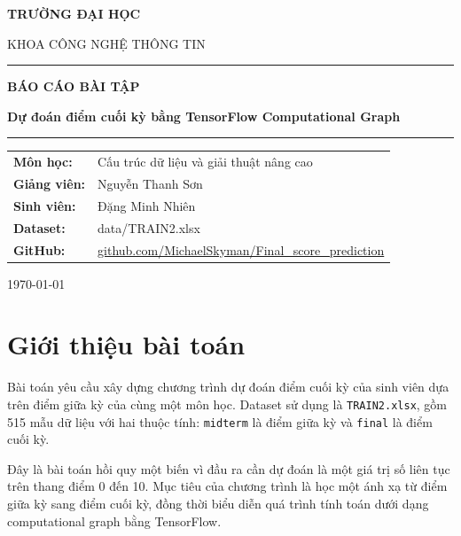\documentclass[12pt,a4paper]{article}
\begin{document}
\begin{titlepage}
    \centering
    \vspace*{0.6cm}
    {\Large\bfseries TRƯỜNG ĐẠI HỌC\par}
    \vspace{0.25cm}
    {\large KHOA CÔNG NGHỆ THÔNG TIN\par}
    \vspace{1.2cm}
    \rule{\textwidth}{1.2pt}
    \vspace{0.9cm}

    {\Huge\bfseries\color{Primary} BÁO CÁO BÀI TẬP\par}
    \vspace{0.45cm}
    {\LARGE\bfseries Dự đoán điểm cuối kỳ bằng TensorFlow Computational Graph\par}

    \vspace{0.9cm}
    \rule{0.78\textwidth}{0.8pt}
    \vspace{1.2cm}

    \begin{tabular}{>{\bfseries}p{4.2cm}p{8.5cm}}
        Môn học: & Cấu trúc dữ liệu và giải thuật nâng cao \\
        Giảng viên: & Nguyễn Thanh Sơn \\
        Sinh viên: & Đặng Minh Nhiên \\
        Dataset: & data/TRAIN2.xlsx \\
        GitHub: & \href{https://github.com/MichaelSkyman/Final_score_prediction}{github.com/MichaelSkyman/Final\_score\_prediction} \\
    \end{tabular}

    \vfill
    {\large \today\par}
\end{titlepage}

\tableofcontents
\newpage

\section{Giới thiệu bài toán}
Bài toán yêu cầu xây dựng chương trình dự đoán điểm cuối kỳ của sinh viên dựa trên điểm giữa kỳ của cùng một môn học.
Dataset sử dụng là \texttt{TRAIN2.xlsx}, gồm 515 mẫu dữ liệu với hai thuộc tính:
\texttt{midterm} là điểm giữa kỳ và \texttt{final} là điểm cuối kỳ.

Đây là bài toán hồi quy một biến vì đầu ra cần dự đoán là một giá trị số liên tục trên thang điểm 0 đến 10.
Mục tiêu của chương trình là học một ánh xạ từ điểm giữa kỳ sang điểm cuối kỳ, đồng thời biểu diễn quá trình tính toán dưới dạng computational graph bằng TensorFlow.
\end{document}
